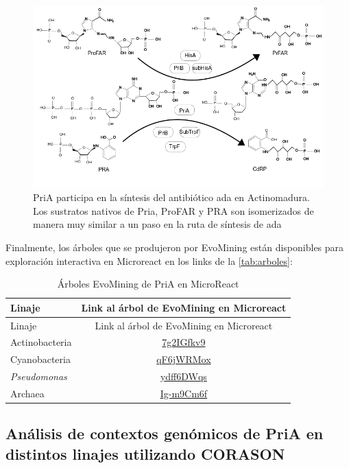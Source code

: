 \documentclass[12pt,twoside]{reedthesis}
\begin{document}
  \begin{figure}[h!tbp]
  \centering
  \includegraphics[angle = 0,scale = 0.6]{chapter4/ada.png}
  \caption[PriA participa en la síntesis del antibiótico {ada} en {Actinomadura} ]{\footnotesize{PriA participa en la síntesis del antibiótico {ada} en {Actinomadura}. Los sustratos nativos de Pria, ProFAR y PRA son isomerizados de manera muy similar a un paso en la ruta de síntesis de {ada} }}
  \label{fig:ada}
  \end{figure}
  
  Finalmente, los árboles que se produjeron por EvoMining están
  disponibles para exploración interactiva en Microreact en los links de
  la \autoref{tab:arboles}:
  
  \begin{longtable}[]{@{}lc@{}}
  \caption{Árboles EvoMining de PriA en MicroReact
  \label{tab:arboles}}\tabularnewline
  \toprule
  Linaje & Link al árbol de EvoMining en Microreact\tabularnewline
  \midrule
  \endfirsthead
  \toprule
  Linaje & Link al árbol de EvoMining en Microreact\tabularnewline
  \midrule
  \endhead
  Actinobacteria &
  \href{https://microreact.org/project/7g2IGfkv9}{7g2IGfkv9}\tabularnewline
  Cyanobacteria &
  \href{https://microreact.org/project/qF6jWRMox}{qF6jWRMox}\tabularnewline
  \emph{Pseudomonas} &
  \href{https://microreact.org/project/ydff6DWqs}{ydff6DWqs}\tabularnewline
  Archaea &
  \href{https://microreact.org/project/Ig-m9Cm6f}{Ig-m9Cm6f}\tabularnewline
  \bottomrule
  \end{longtable}
  
  \subsection{Análisis de contextos genómicos de PriA en distintos linajes
  utilizando
  CORASON}\label{analisis-de-contextos-genomicos-de-pria-en-distintos-linajes-utilizando-corason}
  
\end{document}
